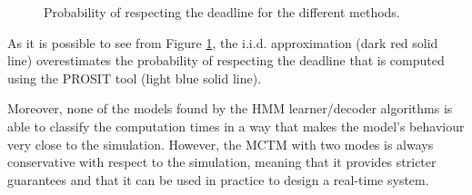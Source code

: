 \begin{figure}[!htb]
    \caption{Probability of respecting the deadline for the different methods.}
    \label{img:deadline_comparison}
\end{figure}

As it is possible to see from Figure \ref{img:deadline_comparison}, the i.i.d.
approximation (dark red solid line) overestimates the probability of respecting
the deadline that is computed using the PROSIT tool (light blue solid line).

Moreover, none of the models found by the HMM learner/decoder algorithms is able
to classify the computation times in a way that makes the model's behaviour very
close to the simulation. However, the MCTM with two modes is always conservative
with respect to the simulation, meaning that it provides stricter guarantees and
that it can be used in practice to design a real-time system.
